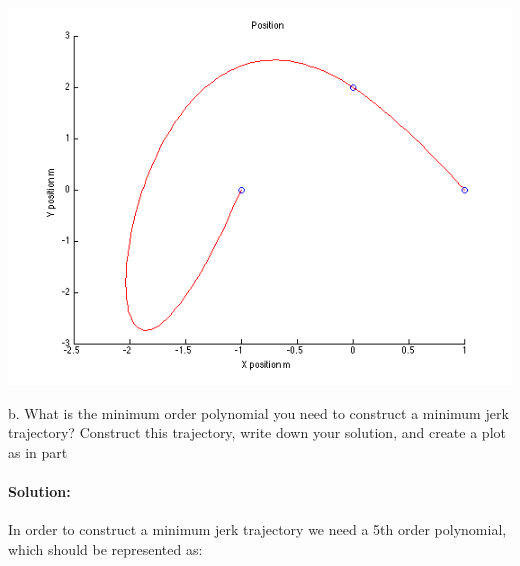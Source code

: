 \documentclass[english]{article}
\begin{document}
\includegraphics[width =\textwidth]{cubic.png}


b. What is the minimum order polynomial you need to construct a minimum jerk trajectory? Construct this trajectory, write down your solution, and create a plot as in part 
\paragraph{Solution:}
In order to construct a minimum jerk trajectory we need a 5th order polynomial, which should be represented as: 
\end{document}
